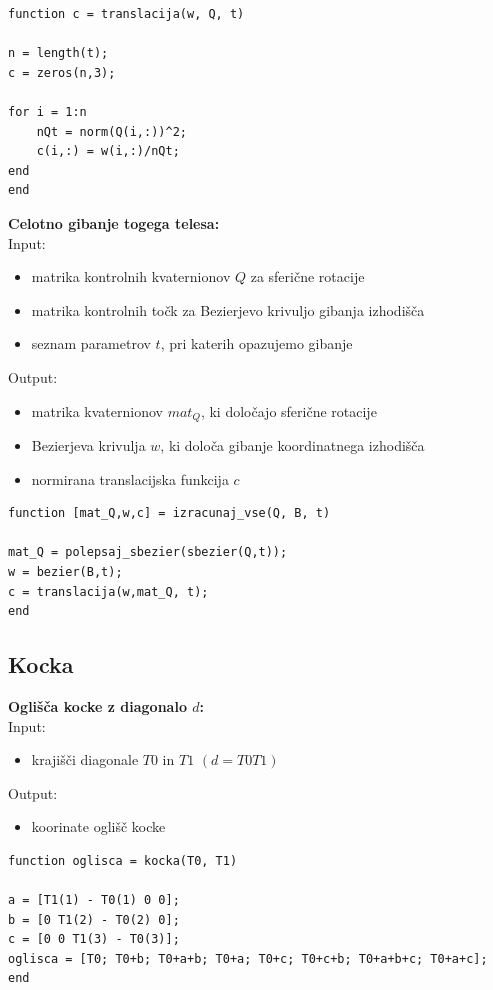 \documentclass[12pt,a4paper,twoside]{article}
\theoremstyle{definition} %
\theoremstyle{plain} %
\numberwithin{equation}{section}  %
\begin{document}
\begin{lstlisting}[caption = {translacija}]
function c = translacija(w, Q, t)

n = length(t);
c = zeros(n,3);

for i = 1:n
    nQt = norm(Q(i,:))^2;
    c(i,:) = w(i,:)/nQt;
end
end
\end{lstlisting}

\newpage

\textbf{Celotno gibanje togega telesa:}\\
Input:
\begin{itemize}
\item matrika kontrolnih kvaternionov $Q$ za sferične rotacije
\item matrika kontrolnih točk za Bezierjevo krivuljo gibanja izhodišča
\item seznam parametrov $t$, pri katerih opazujemo gibanje
\end{itemize}
Output:
\begin{itemize}
\item matrika kvaternionov $mat_Q$, ki določajo sferične rotacije
\item Bezierjeva krivulja $w$, ki določa gibanje koordinatnega izhodišča
\item normirana translacijska funkcija $c$
\end{itemize}

\begin{lstlisting}[caption = {izracunaj\_vse}]
function [mat_Q,w,c] = izracunaj_vse(Q, B, t)

mat_Q = polepsaj_sbezier(sbezier(Q,t));
w = bezier(B,t);
c = translacija(w,mat_Q, t);
end
\end{lstlisting}

\newpage

\subsection{Kocka}

\textbf{Oglišča kocke z diagonalo $d$:}\\
Input:
\begin{itemize}
\item krajišči diagonale $T0$ in $T1$ $(d=T0 T1)$
\end{itemize}
Output:
\begin{itemize}
\item koorinate oglišč kocke
\end{itemize}

\begin{lstlisting}[caption = {kocka}]
function oglisca = kocka(T0, T1)

a = [T1(1) - T0(1) 0 0];
b = [0 T1(2) - T0(2) 0];
c = [0 0 T1(3) - T0(3)];
oglisca = [T0; T0+b; T0+a+b; T0+a; T0+c; T0+c+b; T0+a+b+c; T0+a+c];
end
\end{lstlisting}
\end{document}
